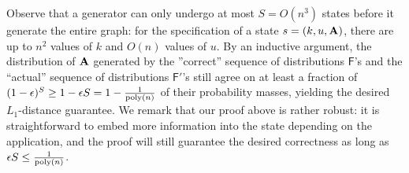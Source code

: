 Observe that a generator can only undergo at most $S = O(n^3)$ states before it generate the entire graph: for the specification of a state $s = (k, u, \mathbf{A})$, there are up to $n^2$ values of $k$ and $O(n)$ values of $u$. By an inductive argument, the distribution of $\mathbf{A}$ generated by the ''correct'' sequence of distributions $\mathsf{F}$'s and the ``actual'' sequence of distributions $\mathsf{F}'$'s still agree on at least a fraction of $(1-\epsilon)^S \geq 1-\epsilon S = 1-\frac{1}{\mathrm{poly}(n)}$ of their probability masses, yielding the desired $L_1$-distance guarantee.
We remark that our proof above is rather robust: it is straightforward to embed more information into the state depending on the application, and the proof will still guarantee the desired correctness as long as $\epsilon S \leq \frac{1}{\mathrm{poly}(n)}$.
\fi

